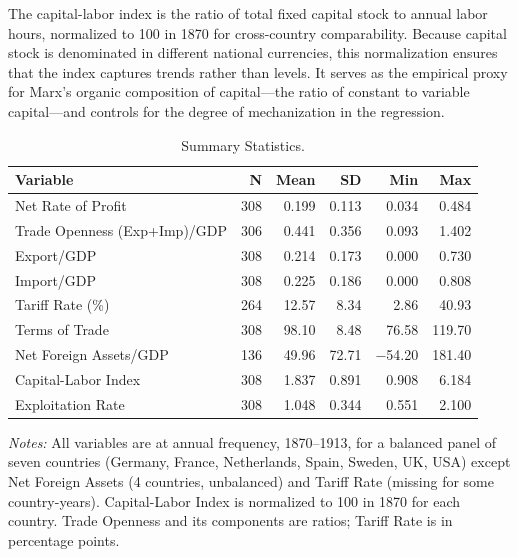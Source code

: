 \documentclass[10pt]{article}
\begin{document}
\par The capital-labor index is the ratio of total fixed capital stock to annual labor hours, normalized to 100 in 1870 for cross-country comparability. Because capital stock is denominated in different national currencies, this normalization ensures that the index captures trends rather than levels. It serves as the empirical proxy for Marx's organic composition of capital---the ratio of constant to variable capital---and controls for the degree of mechanization in the regression.


\begin{table}[!htbp]
\centering
\small
\caption{Summary Statistics.}
\label{tab:summary_stats}
\begin{tabular}{lrrrrr}
\toprule
\textbf{Variable} & \textbf{N} & \textbf{Mean} & \textbf{SD} & \textbf{Min} & \textbf{Max} \\
\midrule
Net Rate of Profit          & 308 & 0.199 & 0.113 & 0.034 & 0.484 \\
Trade Openness (Exp+Imp)/GDP & 306 & 0.441 & 0.356 & 0.093 & 1.402 \\
Export/GDP                  & 308 & 0.214 & 0.173 & 0.000 & 0.730 \\
Import/GDP                  & 308 & 0.225 & 0.186 & 0.000 & 0.808 \\
Tariff Rate (\%)            & 264 & 12.57 & 8.34  & 2.86  & 40.93 \\
Terms of Trade              & 308 & 98.10 & 8.48  & 76.58 & 119.70 \\
Net Foreign Assets/GDP      & 136 & 49.96 & 72.71 & $-$54.20 & 181.40 \\
Capital-Labor Index         & 308 & 1.837 & 0.891 & 0.908 & 6.184 \\
Exploitation Rate           & 308 & 1.048 & 0.344 & 0.551 & 2.100 \\
\bottomrule
\end{tabular}
\begin{minipage}[t]{\textwidth}
\small
\textit{Notes:} All variables are at annual frequency, 1870--1913, for a balanced panel of seven countries (Germany, France, Netherlands, Spain, Sweden, UK, USA) except Net Foreign Assets (4 countries, unbalanced) and Tariff Rate (missing for some country-years). Capital-Labor Index is normalized to 100 in 1870 for each country. Trade Openness and its components are ratios; Tariff Rate is in percentage points.
\end{minipage}
\end{table}
\end{document}

